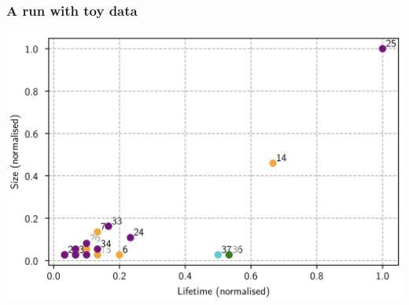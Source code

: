 \documentclass{beamer}
\begin{document}
\begin{frame}
	\frametitle{A run with toy data}
	\centering
	\includegraphics[width=\textwidth]{beamer/toy-results}
\end{frame}
\end{document}
